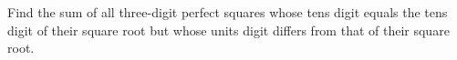 Find the sum of all three-digit perfect squares whose tens digit equals the tens digit of their square root but whose units digit differs from that of their square root.
